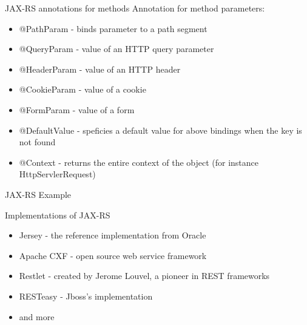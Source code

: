	\begin{frame}{JAX-RS annotations for methods}
		Annotation for method parameters:
		\begin{itemize}
		  \item @PathParam - binds parameter to a path segment
		  \item @QueryParam - value of an HTTP query parameter
		  \item @HeaderParam - value of an HTTP header
		  \item @CookieParam - value of a cookie
		  \item @FormParam - value of a form
		  \item @DefaultValue - speficies a default value for above bindings when the key is not found
		  \item @Context - returns the entire context of the object (for instance HttpServlerRequest) 
		\end{itemize}
	\end{frame}
		
	\begin{frame}{JAX-RS Example}
		
	\end{frame}	
		
	\begin{frame}{Implementations of JAX-RS}
		\begin{itemize}
			\item Jersey - the reference implementation from Oracle
			\item Apache CXF - open source web service framework 
			\item Restlet - created by Jerome Louvel, a pioneer in REST frameworks
			\item RESTeasy - Jboss's implementation
			\item and more
		\end{itemize}
	\end{frame}
